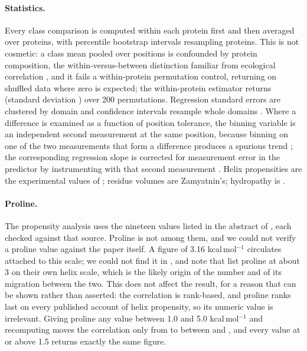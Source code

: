 \documentclass[11pt]{article}
\begin{document}
\paragraph{Statistics.} Every class comparison is computed within each protein first and then
averaged over proteins, with percentile bootstrap intervals resampling proteins. This is not
cosmetic: a class mean pooled over positions is confounded by protein composition, the
within-versus-between distinction familiar from ecological correlation
\citep{robinson1950,simpson1951,mundlak1978}, and it fails a within-protein permutation control, returning \PooledPerm{} on shuffled data where zero is
expected; the within-protein estimator returns \WithinPerm{} (standard deviation \WithinPermSD{})
over 200 permutations. Regression standard errors are clustered by domain \citep{liang1986,cameron2015} and
confidence intervals resample whole domains \citep{field2007}. Where a difference is examined as
a function of position tolerance, the binning variable is an independent second measurement at the
same position, because binning on one of the two measurements that form a difference produces a
spurious trend \citep{blandaltman1995}; the corresponding regression slope is corrected for
measurement error in the predictor by instrumenting with that second measurement
\citep{hausman2001}. Helix propensities are
the experimental values of \citet{pace1998}; residue volumes are Zamyatnin's; hydropathy is
\citet{kyte1982}.

\paragraph{Proline.} The propensity analysis uses the nineteen values listed in the abstract of
\citet{pace1998}, each checked against that source. Proline is not among them, and we could not
verify a proline value against the paper itself. A figure of 3.16 kcal\,mol$^{-1}$ circulates
attached to this scale; we could not find it in \citet{pace1998}, and note that
\citet{oneil1990} list proline at about 3 on their own helix scale, which is the likely origin
of the number and of its migration between the two. This does not affect the result, for a reason
that can be shown rather than asserted: the correlation is rank-based, and proline ranks last on
every published account of helix propensity, so its numeric value is irrelevant. Giving proline
any value between 1.0 and 5.0 kcal\,mol$^{-1}$ and recomputing moves the correlation only from
\RhoPace{} to between \RhoProLo{} and \RhoProHi{}, and every value at or above 1.5 returns
exactly the same figure.
\end{document}
